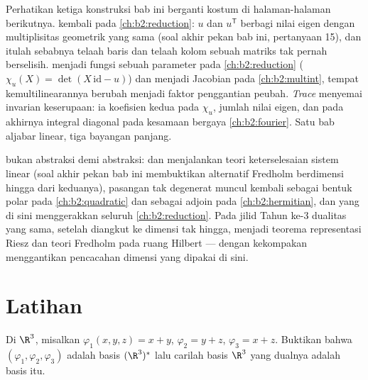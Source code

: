 \begin{remark}\label{rem:b2:linalg:perspectives}
Perhatikan ketiga konstruksi bab ini berganti kostum di
halaman-halaman berikutnya. \emph{} kembali pada
\cref{ch:b2:reduction}: $u$ dan $u^{\mathsf T}$ berbagi
nilai eigen dengan multiplisitas geometrik yang sama (soal akhir
pekan bab ini, pertanyaan 15), dan itulah sebabnya telaah baris dan
telaah kolom sebuah matriks tak pernah berselisih. \emph{}
menjadi fungsi sebuah parameter pada \cref{ch:b2:reduction}
($\chi_u(X) = \det(X\,\mathrm{id} - u)$) dan menjadi Jacobian pada
\cref{ch:b2:multint}, tempat kemultilinearannya berubah menjadi
faktor penggantian peubah. \emph{Trace} menyemai
invarian keserupaan: ia koefisien kedua pada
$\chi_u$, jumlah nilai eigen, dan pada akhirnya integral
diagonal pada kesamaan bergaya \cref{ch:b2:fourier}. Satu
bab aljabar linear, tiga bayangan panjang.
\end{remark}

\begin{remark}
 bukan abstraksi demi abstraksi: 
dan  menjalankan teori keterselesaian sistem linear (soal
akhir pekan bab ini membuktikan alternatif Fredholm berdimensi hingga
dari keduanya), pasangan tak degenerat muncul kembali sebagai
bentuk polar pada \cref{ch:b2:quadratic} dan sebagai adjoin pada
\cref{ch:b2:hermitian}, dan  yang  di sini
menggerakkan seluruh \cref{ch:b2:reduction}. Pada jilid Tahun ke-3
dualitas yang sama, setelah diangkut ke dimensi tak hingga, menjadi
teorema representasi Riesz dan teori Fredholm pada ruang
Hilbert --- dengan kekompakan menggantikan pencacahan dimensi yang
dipakai di sini.
\end{remark}

\section{Latihan}

\begin{exercise}[$\star$]\label{exo:b2:linalg:1}
Di $\R^3$, misalkan $\varphi_1(x,y,z) = x + y$, $\varphi_2 = y + z$,
$\varphi_3 = x + z$. Buktikan bahwa $(\varphi_1, \varphi_2, \varphi_3)$
adalah basis $(\R^3)^*$ lalu carilah basis $\R^3$ yang dualnya adalah
basis itu.
\end{exercise}

